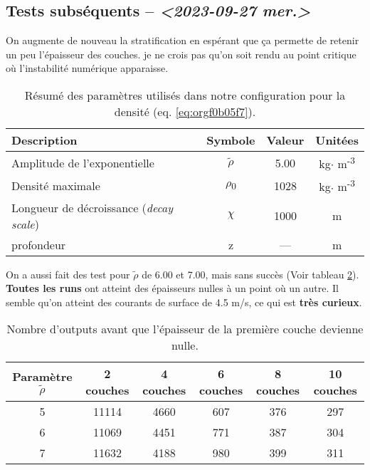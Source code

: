 \documentclass[10pt]{article}
\numberwithin{equation}{section}
\begin{document}
\subsection{Tests subséquents -- \textit{<2023-09-27 mer.>}}
\label{sec:org01e2cb0}

On augmente de nouveau la stratification en espérant que ça permette de retenir un peu l'épaisseur des couches.
je ne crois pas qu'on soit rendu au point critique où l'instabilité numérique apparaisse. 
\begin{table}[htbp]
\caption{\label{tab:org1c09ed7}Résumé des paramètres utilisés dans notre configuration pour la densité (eq. \ref{eq:orgf0b05f7}).}
\centering
\begin{tabular}{lccc}
\hline
\hline
Description & Symbole & Valeur & Unitées\\[0pt]
\hline
Amplitude de l'exponentielle & \(\tilde{\rho}\) & 5.00 & kg\(\cdot\) m\textsuperscript{-3}\\[0pt]
Densité maximale & \(\rho\)\textsubscript{0} & 1028 & kg\(\cdot\) m\textsuperscript{-3}\\[0pt]
Longueur de décroissance (\emph{decay scale}) & \(\chi\) & 1000 & m\\[0pt]
profondeur & z & --- & m\\[0pt]
\hline
\end{tabular}
\end{table}

On a aussi fait des test pour \(\tilde{\rho}\) de 6.00 et 7.00, mais sans succès (Voir tableau \ref{tab:orgecc4495}).
\textbf{Toutes les runs} ont atteint des épaisseurs nulles à un point où un autre.
Il semble qu'on atteint des courants de surface de 4.5 m/s, ce qui est \textbf{très curieux}.

\begin{table}[htbp]
\caption{\label{tab:orgecc4495}Nombre d'outputs avant que l'épaisseur de la première couche devienne nulle.}
\centering
\begin{tabular}{cccccc}
\hline
\hline
Paramètre \(\tilde{\rho}\) & 2 couches & 4 couches & 6 couches & 8 couches & 10 couches\\[0pt]
\hline
5 & 11114 & 4660 & 607 & 376 & 297\\[0pt]
6 & 11069 & 4451 & 771 & 387 & 304\\[0pt]
7 & 11632 & 4188 & 980 & 399 & 311\\[0pt]
\hline
\end{tabular}
\end{table}
\end{document}
